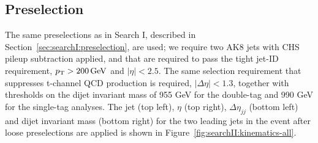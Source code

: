 \subsection{Preselection}
\label{sec:searchII:presel}
The same preselections as in Search I, described in Section~\ref{sec:searchI:preselection}, are used; we require two AK8 jets with CHS pileup subtraction applied, and that are required to pass the tight jet-ID requirement, $p_{\mathrm{T}}>200 \,\text{Ge\hspace{-.08em}V}$ and $|\eta|<2.5$. The same selection requirement that suppresses t-channel QCD production is required, $|\Delta \eta|<1.3$, together with thresholds on the dijet invariant mass of 955 GeV for the double-tag and 990 GeV for the single-tag analyses. The jet \PT (top left), $\eta$ (top right), $\Delta \eta_{jj}$ (bottom left) and dijet invariant mass (bottom right) for the two leading jets in the event after loose preselections are applied is shown in Figure~\ref{fig:searchII:kinematics-all}.
